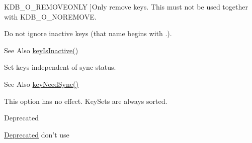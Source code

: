 \begin{Desc}
\begin{description}
{\hypertarget{group__keyset_gga98a3d6a4016c9dad9cbd1a99a9c2a45aaf6ed09cee8aa8cf0d6a0e318a7105440}{K\-D\-B\-\_\-\-O\-\_\-\-R\-E\-M\-O\-V\-E\-O\-N\-L\-Y}\label{group__keyset_gga98a3d6a4016c9dad9cbd1a99a9c2a45aaf6ed09cee8aa8cf0d6a0e318a7105440}
}]Only remove keys. This must not be used together with K\-D\-B\-\_\-\-O\-\_\-\-N\-O\-R\-E\-M\-O\-V\-E. \item[{\em 
\hypertarget{group__keyset_gga98a3d6a4016c9dad9cbd1a99a9c2a45aa789926d8a8e15b029cf7dded4154bcda}{K\-D\-B\-\_\-\-O\-\_\-\-I\-N\-A\-C\-T\-I\-V\-E}\label{group__keyset_gga98a3d6a4016c9dad9cbd1a99a9c2a45aa789926d8a8e15b029cf7dded4154bcda}
}]Do not ignore inactive keys (that name begins with .). \begin{DoxySeeAlso}{See Also}
\hyperlink{group__keytest_gaa25f699f592031c1a0abc1504d14e13e}{key\-Is\-Inactive()} 
\end{DoxySeeAlso}
\item[{\em 
\hypertarget{group__keyset_gga98a3d6a4016c9dad9cbd1a99a9c2a45aaa7d5265eacbb1590982b718f35443e2e}{K\-D\-B\-\_\-\-O\-\_\-\-S\-Y\-N\-C}\label{group__keyset_gga98a3d6a4016c9dad9cbd1a99a9c2a45aaa7d5265eacbb1590982b718f35443e2e}
}]Set keys independent of sync status. \begin{DoxySeeAlso}{See Also}
\hyperlink{group__keytest_gaf247df0de7aca04b32ef80e39ef12950}{key\-Need\-Sync()} 
\end{DoxySeeAlso}
\item[{\em 
\hypertarget{group__keyset_gga98a3d6a4016c9dad9cbd1a99a9c2a45aad9d03b36ee88ca5a774cc01b190c99b8}{K\-D\-B\-\_\-\-O\-\_\-\-S\-O\-R\-T}\label{group__keyset_gga98a3d6a4016c9dad9cbd1a99a9c2a45aad9d03b36ee88ca5a774cc01b190c99b8}
}]This option has no effect. Key\-Sets are always sorted. \begin{DoxyRefDesc}{Deprecated}
\item[\hyperlink{deprecated__deprecated000001}{Deprecated}]don't use \end{DoxyRefDesc}

\end{description}
\end{Desc}
